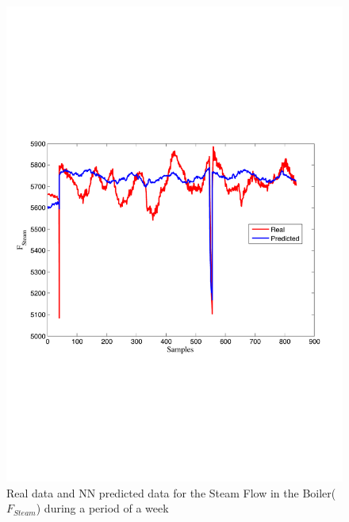 \begin{figure}
\includegraphics[width=1\textwidth]{nne1bis.pdf}
\caption{Real data and NN predicted data for the Steam Flow in the Boiler($F_{Steam}$) during a period of a week}
\label{Fboiler}
\end{figure}

